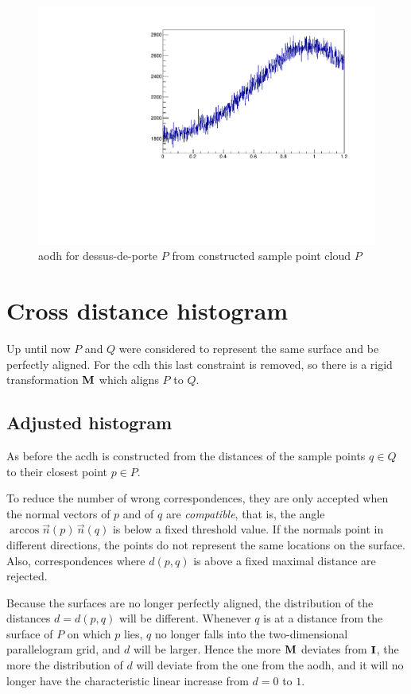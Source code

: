 \begin{figure}[h]
\centering
\includegraphics[width=.4\textwidth]{fig/ddp_adj.pdf}
\caption{\Gls{aodh} for dessus-de-porte $P$ from constructed sample point cloud $P$}
\label{fig:ddp_adj}
\end{figure}

\FloatBarrier

\section{Cross distance histogram}
Up until now $P$ and $Q$ were considered to represent the same surface and be perfectly aligned. For the \gls{cdh} this last constraint is removed, so there is a rigid transformation $\mathbf{M}$ which aligns $P$ to $Q$.


\subsection{Adjusted histogram}
As before the \gls{acdh} is constructed from the distances of the sample points $q \in Q$ to their closest point $p \in P$.

To reduce the number of wrong correspondences, they are only accepted when the normal vectors of $p$ and of $q$ are \emph{compatible}, that is, the angle $\arccos \vec{n}(p) \, \vec{n}(q)$ is below a fixed threshold value. If the normals point in different directions, the points do not represent the same locations on the surface. Also, correspondences where $d(p, q)$ is above a fixed maximal distance are rejected.

Because the surfaces are no longer perfectly aligned, the distribution of the distances $d = d(p, q)$ will be different. Whenever $q$ is at a distance from the surface of $P$ on which $p$ lies, $q$ no longer falls into the two-dimensional parallelogram grid, and $d$ will be larger. Hence the more $\mathbf{M}$ deviates from $\mathbf{I}$, the more the distribution of $d$ will deviate from the one from the \gls{aodh}, and it will no longer have the characteristic linear increase from $d = 0$ to $1$.


